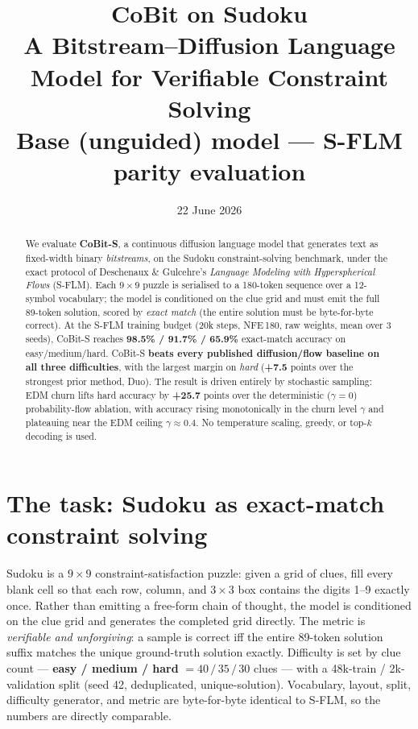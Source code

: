 \documentclass[11pt]{article}
\title{\vspace{-2em}\textbf{CoBit on Sudoku}\\[4pt]
\large A Bitstream--Diffusion Language Model for Verifiable Constraint Solving\\[2pt]
\normalsize Base (unguided) model --- S-FLM parity evaluation}
\date{22 June 2026}
\begin{document}
\maketitle
\thispagestyle{empty}

\begin{abstract}
\noindent We evaluate \textbf{CoBit-S}, a continuous diffusion language model that generates text as
fixed-width binary \emph{bitstreams}, on the Sudoku constraint-solving benchmark, under the exact
protocol of Deschenaux \& Gulcehre's \emph{Language Modeling with Hyperspherical Flows} (S-FLM). Each
$9{\times}9$ puzzle is serialised to a 180-token sequence over a 12-symbol vocabulary; the model is
conditioned on the clue grid and must emit the full 89-token solution, scored by \emph{exact match}
(the entire solution must be byte-for-byte correct). At the S-FLM training budget (20k steps, NFE\,180,
raw weights, mean over 3 seeds), CoBit-S reaches \textbf{98.5\% / 91.7\% / 65.9\%} exact-match accuracy on
easy/medium/hard. CoBit-S \textbf{beats every published diffusion/flow baseline on all three
difficulties}, with the largest margin on \emph{hard} (\textbf{+7.5} points over the strongest prior
method, Duo). The result is driven entirely by stochastic sampling: EDM churn lifts hard accuracy by
\textbf{+25.7} points over the deterministic ($\gamma{=}0$) probability-flow ablation, with accuracy
rising monotonically in the churn level $\gamma$ and plateauing near the EDM ceiling
$\gamma{\approx}0.4$. No temperature scaling, greedy, or top-$k$ decoding is used.
\end{abstract}

\section{The task: Sudoku as exact-match constraint solving}

Sudoku is a $9{\times}9$ constraint-satisfaction puzzle: given a grid of clues, fill every blank cell so
that each row, column, and $3{\times}3$ box contains the digits 1--9 exactly once. Rather than emitting a
free-form chain of thought, the model is conditioned on the clue grid and generates the completed grid
directly. The metric is \emph{verifiable and unforgiving}: a sample is correct iff the entire 89-token
solution suffix matches the unique ground-truth solution exactly. Difficulty is set by clue count ---
\textbf{easy / medium / hard} $=40\,/\,35\,/\,30$ clues --- with a 48k-train / 2k-validation split (seed 42,
deduplicated, unique-solution). Vocabulary, layout, split, difficulty generator, and metric are
byte-for-byte identical to S-FLM, so the numbers are directly comparable.
\end{document}
